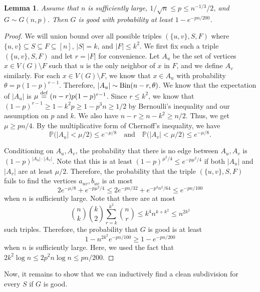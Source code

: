 \documentclass[reqno]{amsart}
\newtheorem{lemma}[theorem]{Lemma}
\theoremstyle{definition}
\numberwithin{theorem}{section}
\renewcommand{\leq}{\le}
\renewcommand{\geq}{\ge}
\def\eqdef{\overset{\rm{def}}{=}}
\renewcommand{\le}{\leqslant}
\renewcommand{\ge}{\geqslant}
\newcommand{\PP}{\mathbb P}
\newcommand{\abs}[1]{\left|#1\right|}
\begin{document}
\begin{lemma}
\label{lem:sparse-reservoir}
Assume that $n$ is sufficiently large, $1/\sqrt{n}\leq p\leq n^{-1/3}/2$, and $G\sim G(n,p)$.
Then $G$ is good with probability at least $1-e^{-pn/200}$.
\end{lemma}
\begin{proof}
    We will union bound over all possible triples $(\{u,v\},S,F)$ where $\{u,v\}\subseteq S \subseteq F \subseteq [n]$, $\abs{S}=k$, and $|F| \le k^2$. We first fix such a triple $(\{u,v\},S,F)$ and let $r=\abs{F}$ for convenience.
    Let $A_u$ be the set of vertices $x\in V(G)\setminus F$ such that $u$ is the only neighbor of $x$ in $F$, and we define $A_v$ similarly.
    For each $x\in V(G)\setminus F$, we know that $x\in A_u$ with probability $\theta=p(1-p)^{r-1}$. Therefore, $\abs{A_u}\sim\textup{Bin}(n-r,\theta)$. We know that the expectation of $\abs{A_u}$ is $\mu\eqdef(n-r)p(1-p)^{r-1}$. Since $r\leq k^2$, we know that $(1-p)^{r-1}\geq 1-k^2p\geq 1-p^3n\geq 1/2$ by Bernoulli's inequality and our assumption on $p$ and $k$. We also have $n-r\geq n-k^2\geq n/2$. Thus, we get $\mu\geq pn/4$. By the multiplicative form of Chernoff's inequality, we have
\[
\PP\bigl(|A_u| < \mu/2\bigr) \le e^{-\mu/8}
\quad\text{and}\quad
\PP\bigl(|A_v| < \mu/2\bigr) \le e^{-\mu/8}.
\]

Conditioning on $A_u,A_v$, the probability that there is no edge between $A_u,A_v$ is $(1-p)^{\abs{A_u}\cdot\abs{A_v}}$. Note that this is at least $(1-p)^{\mu^2/4}\leq e^{-p\mu^2/4}$ if both $\abs{A_u}$ and $\abs{A_v}$ are at least $\mu/2$. Therefore, the probability that the triple $(\{u,v\},S,F)$ fails to find the vertices $a_{uv},b_{uv}$ is at most 
\[2e^{-\mu/8}+e^{-p\mu^2/4}\leq 2e^{-pn/32}+e^{-p^3n^2/64}\leq e^{-pn/100}\]
when $n$ is sufficiently large.
Note that there are at most 
\[
\binom{n}{k} \binom{k}{2}\sum_{r=k}^{k^2} \binom{n}{r}
 \le k^4n^{k+k^2}\leq n^{2k^2}
\]
such triples. Therefore, the probability that $G$ is good is at least
\[1-n^{2k^2} e^{-pn/100}\geq 1-e^{-pn/200}\]
when $n$ is sufficiently large. Here, we used the fact that $2k^2\log n\leq 2p^2n\log n\leq pn/200$.
\end{proof}

Now, it remains to show that we can inductively find a clean subdivision for every $S$ if $G$ is good.
\end{document}

